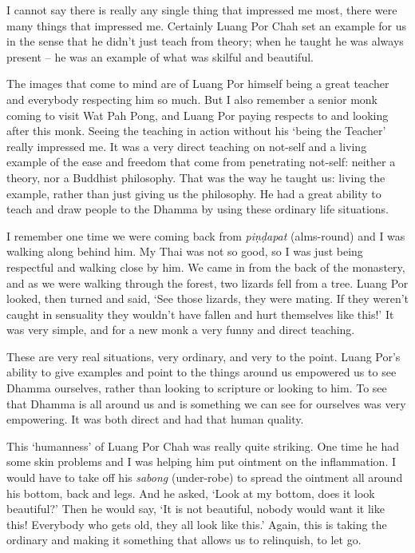 I cannot say there is really any single thing that impressed me most, 
there were many things that impressed me. Certainly Luang Por Chah set
an example for us in the sense that he didn't just teach from theory; 
when he taught he was always present -- he was an example of what was
skilful and beautiful. 

The images that come to mind are of Luang Por himself being a great
teacher and everybody respecting him so much. But I also remember a
senior monk coming to visit Wat Pah Pong, and Luang Por paying respects
to and looking after this monk. Seeing the teaching in action without
his `being the Teacher' really impressed me. It was a very direct
teaching on not-self and a living example of the ease and freedom that
come from penetrating not-self: neither a theory, nor a Buddhist
philosophy. That was the way he taught us: living the example, rather
than just giving us the philosophy. He had a great ability to teach and
draw people to the Dhamma by using these ordinary life situations. 

I remember one time we were coming back from \emph{piṇḍapat} (alms-round)
and I was walking along behind him. My Thai was not so good, so I
was just being respectful and walking close by him. We came in from the
back of the monastery, and as we were walking through the forest, two
lizards fell from a tree. Luang Por looked, then turned and said, `See
those lizards, they were mating. If they weren't caught in sensuality
they wouldn't have fallen and hurt themselves like this!' It was very
simple, and for a new monk a very funny and direct teaching. 

These are very real situations, very ordinary, and very to the point. 
Luang Por's ability to give examples and point to the things around us
empowered us to see Dhamma ourselves, rather than looking to scripture
or looking to him. To see that Dhamma is all around us and is something
we can see for ourselves was very empowering. It was both direct and had
that human quality. 

This `humanness' of Luang Por Chah was really quite striking. One time
he had some skin problems and I was helping him put ointment on the
inflammation. I would have to take off his \emph{sabong} (under-robe) to
spread the ointment all around his bottom, back and legs. And he asked, 
`Look at my bottom, does it look beautiful?' Then he would say, `It is
not beautiful, nobody would want it like this! Everybody who gets old, 
they all look like this.' Again, this is taking the ordinary and making
it something that allows us to relinquish, to let go. 

